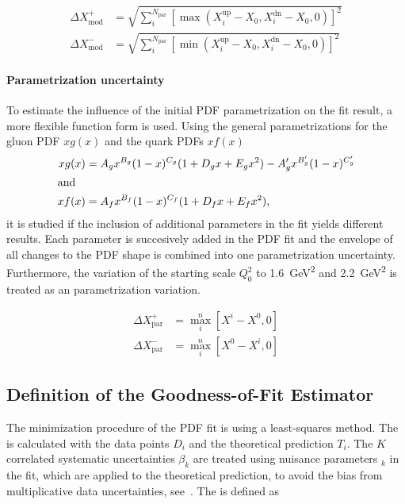 \begin{align*}
  \Delta X^+_{\mathrm{mod}} &= \sqrt{\sum_i^{N_{\mathrm{par}}} \left[ \max(X_i^{\mathrm{up}}
    -X_0, X_i^{\mathrm{dn}} - X_0, 0)\right]^2}\\
    \Delta X^-_{\mathrm{mod}} &= \sqrt{\sum_i^{N_{\mathrm{par}}} \left[ \min(X_i^{\mathrm{up}} - X_0, X_i^{\mathrm{dn}} - X_0,0)\right]^2}
\end{align*}

\paragraph{Parametrization uncertainty}

To estimate the influence of the initial PDF parametrization on the fit result, a
more flexible function form is used. Using the general
parametrizations for the gluon PDF $xg(x)$ and the quark PDFs $xf(x)$
%
\begin{align*}
   xg(x) &= A_g x^{B_g} (1-x)^{C_g} (1  + D_g x + E_g x^2) - A'_g x^{B'_g} (1-x)^{C'_g}\\
\intertext{and}
   xf(x) &= A_{f}  x^{B_{f}} (1-x)^{C_{f}} (1 + D_{f}x + E_{f}x^2),
\end{align*}
%
it is studied if the inclusion of additional parameters in the fit yields
different results. Each parameter is succesively added in the PDF fit and the
envelope of all changes to the PDF shape is combined into one parametrization
uncertainty. Furthermore, the variation of the starting scale $Q_0^2$ to
\SI{1.6}{\GeV\squared} and \SI{2.2}{\GeV\squared} is treated as an 
parametrization variation.

\begin{align*}
  \Delta X^+_{\mathrm{par}} &= \max_{i}^{n} \left[ X^i - X^0, 0 \right]\\
  \Delta X^-_{\mathrm{par}} &= \max_{i}^{n} \left[ X^0 - X^i, 0 \right]
\end{align*}


\subsection{Definition of the Goodness-of-Fit Estimator}
\label{sec:chi2_definition}

The minimization procedure of the PDF fit is using a least-squares method. The \chisq is
calculated with the data points $D_i$ and the theoretical prediction $T_i$. The
$K$  correlated systematic uncertainties $\beta_{k}$ are treated using nuisance parameters
$_k$ in the fit, which are applied to the theoretical prediction, to avoid the bias from
multiplicative data uncertainties, see~\cite{Lyons:1989gh}. The \chisq is
defined as

